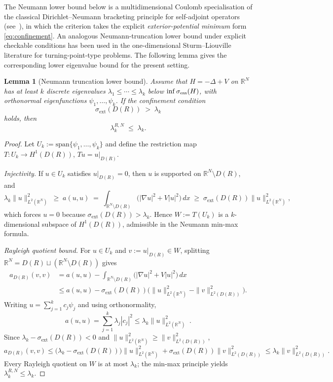 \documentclass[11pt]{article}
\theoremstyle{plain}
\newtheorem{lemma}{Lemma}
\theoremstyle{definition}
\theoremstyle{remark}
\newcommand{\R}{\mathbb{R}}
\newcommand{\dx}{\,dx}
\begin{document}
The Neumann lower bound below is a multidimensional Coulomb
specialisation of the classical Dirichlet--Neumann bracketing
principle for self-adjoint operators (see~\cite[Sec.~XIII.15]{Reed-Simon}),
in which the criterion takes the explicit
\emph{exterior-potential minimum} form \eqref{eq:confinement}. An
analogous Neumann-truncation lower bound under explicit checkable
conditions has been used in the one-dimensional Sturm--Liouville
literature for turning-point-type problems. The following lemma gives
the corresponding lower eigenvalue bound for the present setting.

\begin{lemma}[Neumann truncation lower bound]
\label{lem:neumann-lb}
%
Assume that $H = -\Delta + V$ on $\R^N$ has at least $k$ discrete
eigenvalues $\lambda_1 \le \cdots \le \lambda_k$ below
$\inf\sigma_{\rm ess}(H)$, with orthonormal eigenfunctions
$\psi_1,\ldots,\psi_k$.  If the confinement condition
\begin{equation}
\label{eq:confinement}
  \sigma_{\mathrm{ext}}(D(R)) \;>\; \lambda_k
\end{equation}
holds, then
\begin{equation}
\label{eq:neumann-lower}
  \lambda_k^{R,N} \;\le\; \lambda_k.
\end{equation}
\end{lemma}

\begin{proof}
Let $U_k := \mathrm{span}\{\psi_1,\ldots,\psi_k\}$ and define the
restriction map $T\colon U_k \to H^1(D(R))$, $Tu = u|_{D(R)}$.

\emph{Injectivity.}  If $u \in U_k$ satisfies $u|_{D(R)} = 0$,
then $u$ is supported on $\R^N \setminus D(R)$, and
\[
  \lambda_k\|u\|_{L^2(\R^N)}^2
  \;\ge\; a(u,u)
  \;=\; \int_{\R^N\setminus D(R)}\!\bigl(|\nabla u|^2+V|u|^2\bigr)\dx
  \;\ge\; \sigma_{\mathrm{ext}}(D(R))\|u\|_{L^2(\R^N)}^2,
\]
which forces $u = 0$ because $\sigma_{\mathrm{ext}}(D(R)) > \lambda_k$.
Hence $W := T(U_k)$ is a $k$-dimensional subspace of $H^1(D(R))$,
admissible in the Neumann min-max formula.

\emph{Rayleigh quotient bound.}  For $u \in U_k$ and
$v := u|_{D(R)} \in W$, splitting
$\R^N = D(R) \sqcup (\R^N\setminus D(R))$ gives
\begin{align*}
  a_{D(R)}(v,v)
  &= a(u,u) - \int_{\R^N\setminus D(R)}\!
     \bigl(|\nabla u|^2+V|u|^2\bigr)\dx \\
  &\le a(u,u)
     - \sigma_{\mathrm{ext}}(D(R))\bigl(\|u\|_{L^2(\R^N)}^2
     - \|v\|_{L^2(D(R))}^2\bigr).
\end{align*}
Writing $u = \sum_{j=1}^k c_j\psi_j$ and using orthonormality,
$$
 a(u,u) = \sum_{j=1}^k \lambda_j|c_j|^2
\le \lambda_k\|u\|_{L^2(\R^N)}^2\;.
$$
Since $\lambda_k - \sigma_{\mathrm{ext}}(D(R)) < 0$ and
$\|u\|_{L^2(\R^N)}^2 \ge \|v\|_{L^2(D(R))}^2$,
\[
  a_{D(R)}(v,v)
  \le \bigl(\lambda_k - \sigma_{\mathrm{ext}}(D(R))\bigr)
          \|u\|_{L^2(\R^N)}^2
        + \sigma_{\mathrm{ext}}(D(R))\|v\|_{L^2(D(R))}^2
  \le \lambda_k\|v\|_{L^2(D(R))}^2.
\]
Every Rayleigh quotient on $W$ is at most $\lambda_k$; the
min-max principle yields $\lambda_k^{R,N} \le \lambda_k$.
\end{proof}
\end{document}
